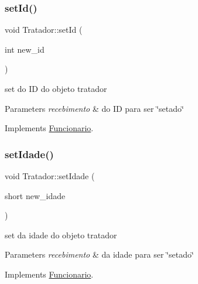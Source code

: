 \mbox{\label{class_tratador_a6546aab57e697193f8593d9682c95c0c}} 
\subsubsection{\texorpdfstring{setId()}{setId()}}
{\footnotesize\ttfamily void Tratador\+::set\+Id (\begin{DoxyParamCaption}\item[{int}]{new\+\_\+id }\end{DoxyParamCaption})\hspace{0.3cm}{\ttfamily [virtual]}}



set do ID do objeto tratador 


\begin{DoxyParams}{Parameters}
{\em recebimento} & do ID para ser \char`\"{}setado\char`\"{} \\
\hline
\end{DoxyParams}


Implements \mbox{\hyperlink{class_funcionario_aabcee2d8617c88ba10bb7b6f3f7f41ac}{Funcionario}}.

\mbox{\label{class_tratador_a6a396af90d3a7bab6ecf38c495fc2b4c}} 
\subsubsection{\texorpdfstring{setIdade()}{setIdade()}}
{\footnotesize\ttfamily void Tratador\+::set\+Idade (\begin{DoxyParamCaption}\item[{short}]{new\+\_\+idade }\end{DoxyParamCaption})\hspace{0.3cm}{\ttfamily [virtual]}}



set da idade do objeto tratador 


\begin{DoxyParams}{Parameters}
{\em recebimento} & da idade para ser \char`\"{}setado\char`\"{} \\
\hline
\end{DoxyParams}


Implements \mbox{\hyperlink{class_funcionario}{Funcionario}}.

